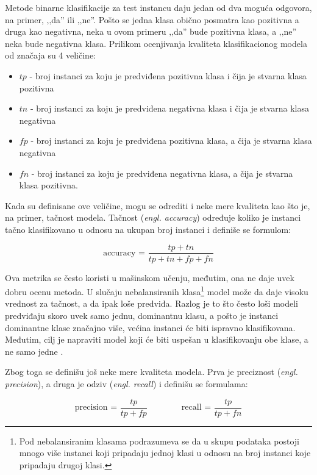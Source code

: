 Metode binarne klasifikacije za test instancu daju jedan od dva moguća odgovora, na primer, ‚‚da'' ili ‚‚ne''. Pošto se jedna klasa obično posmatra kao pozitivna a druga kao negativna, neka u ovom primeru ‚‚da'' bude pozitivna klasa, a ‚‚ne'' neka bude negativna klasa. Prilikom ocenjivanja kvaliteta klasifikacionog modela od značaja su 4 veličine:

\begin{itemize}
	\item $tp$ - broj instanci za koju je predviđena pozitivna klasa i čija je stvarna klasa pozitivna
	
	\item $tn$ - broj instanci za koju je predviđena negativna klasa i čija je stvarna klasa negativna
	
	\item $fp$  - broj instanci za koju je predviđena pozitivna klasa, a čija je stvarna klasa negativna
	
	\item $fn$ - broj instanci za koju je predviđena negativna klasa, a čija je stvarna klasa pozitivna.
	
\end{itemize}


Kada su definisane ove veličine, mogu se odrediti i neke mere kvaliteta kao što je, na primer, tačnost modela. Tačnost (\textit{engl. accuracy}) određuje koliko je instanci tačno klasifikovano u odnosu na ukupan broj instanci i definiše se formulom:

$$\text{accuracy = } \dfrac{tp + tn}{tp +tn +fp +fn}$$ 

Ova metrika se često koristi u mašinskom učenju, međutim, ona ne daje uvek dobru ocenu metoda. U slučaju nebalansiranih klasa\footnote{Pod nebalansiranim klasama podrazumeva se da u skupu podataka postoji mnogo više instanci koji pripadaju jednoj klasi u odnosu na broj instanci koje pripadaju drugoj klasi.} model može da daje visoku vrednost za tačnost, a da ipak loše predviđa. Razlog je to što često loši modeli predviđaju skoro uvek samo jednu, dominantnu klasu, a pošto je instanci dominantne klase značajno više, većina instanci će biti ispravno klasifikovana. Međutim, cilj je napraviti model koji će biti uspešan u klasifikovanju obe klase, a ne samo jedne \cite{f1}.

Zbog toga se definišu još neke mere kvaliteta modela. Prva je preciznost (\textit{engl. precision}), a druga je odziv (\textit{engl. recall}) i definišu se formulama:

$$ \text{precision = } \dfrac{tp}{tp + fp}  \qquad  \qquad \text{recall = } \dfrac{tp}{tp + fn}$$

